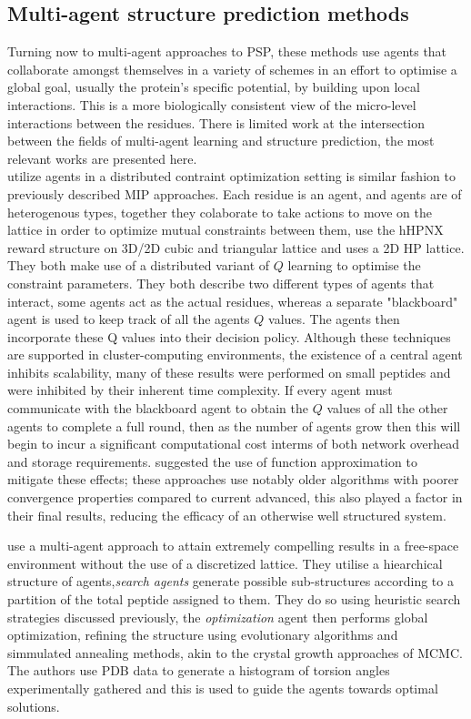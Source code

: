 \subsection{Multi-agent structure prediction methods}
Turning now to multi-agent approaches to PSP, these methods use agents that collaborate
amongst themselves in a variety of schemes in an effort to optimise a global goal, usually the protein's specific
potential, by building upon local interactions. This is a more biologically consistent view of the micro-level
interactions between the residues. There is limited work at the intersection between the fields of multi-agent learning
and structure prediction, the most relevant works are presented here.\\

 \cite{Muscalagiu2013,Czibula2011} utilize agents in a distributed contraint optimization setting is similar fashion to previously described MIP
 approaches. Each residue is an agent, and agents are of heterogenous types, together they colaborate to take
 actions to move on the lattice in order to optimize mutual constraints between them,
 \cite{Muscalagiu2013} use the hHPNX reward structure on 3D/2D cubic and triangular lattice and \cite{Czibula2011} uses a 2D HP lattice.
 They both make use of a distributed variant of $Q$ learning to optimise the constraint parameters. They both
 describe two different types of agents that interact, some agents act as the actual residues, whereas
 a separate "blackboard" agent is used to keep track of all the agents $Q$ values. The agents then 
 incorporate these Q values into their decision policy. Although these techniques are supported in cluster-computing
 environments, the existence of a central agent inhibits scalability, many of these results were performed 
 on small peptides and were inhibited by their inherent time complexity. If every agent must communicate with 
 the blackboard agent to obtain the $Q$ values of all the other agents to complete a full round, then as the number
 of agents grow then this will begin to incur a significant computational cost interms of both network overhead and
 storage requirements. \cite{Czibula2011} suggested the use of function approximation to mitigate these effects;
 these approaches use notably older algorithms with poorer convergence properties compared to current advanced,
 this also played a factor in their final results, reducing the efficacy of an otherwise well structured system.

 \cite{deLimaCorrea2017} use a multi-agent approach to attain extremely compelling results in a free-space environment
 without the use of a discretized lattice. They utilise a hiearchical structure of agents,\emph{search agents} generate possible
 sub-structures according to a partition of the total peptide assigned to them. They do so using heuristic search strategies 
 discussed previously, the \emph{optimization} agent then performs global optimization, refining the structure
 using evolutionary algorithms and simmulated annealing methods, akin to the crystal growth approaches of MCMC.
 The authors use PDB data to generate a histogram of torsion angles experimentally gathered and this is used to 
 guide the agents towards optimal solutions.